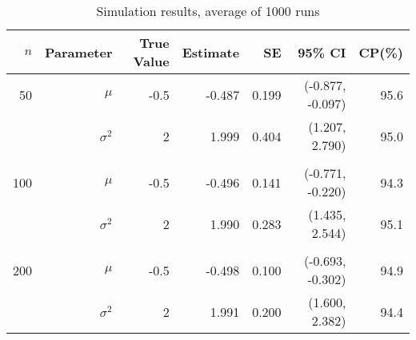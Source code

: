 \documentclass{article}
\begin{document}
\begin{table}[h]
	\centering
	\caption{Simulation results, average of 1000 runs}
	\begin{tabular}{|rrrrrrr|}
		\hline
		$n$&Parameter&True Value&Estimate&SE& 95\% CI&CP(\%)\\
		\hline
		50  & $\mu$ & -0.5 & -0.487   & 0.199& (-0.877, -0.097) & 95.6 \\
		    & $\sigma^2$  & 2 & 1.999 & 0.404 & (1.207, 2.790)  & 95.0 \\
		    &&&&&& \\
		100 & $\mu$ & -0.5 & -0.496 & 0.141 & (-0.771, -0.220) & 94.3 \\
		    & $\sigma^2$ & 2 & 1.990 & 0.283 & (1.435, 2.544) &  95.1\\
		    &&&&&& \\
		200 & $\mu$ & -0.5 & -0.498 & 0.100 & (-0.693, -0.302) & 94.9\\ 
		    & $\sigma^2$ & 2 & 1.991 & 0.200 & (1.600, 2.382) & 94.4 \\
		\hline
	\end{tabular}
\end{table}

	
\end{document}
